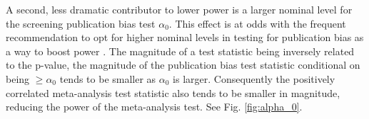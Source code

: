 \documentclass[12pt]{article}
\newcommand{\z}{Z}
\newcommand{\comment}[1]{
  \iftoggle{commenttoggle}{
    {\normalsize{\color{red}{ #1}}\normalsize}
  }
  {}
}
\begin{document}
A second, less dramatic contributor to lower power is a larger nominal level for
the screening publication bias test $\alpha_0$. \comment{For example, [[]]} This
effect is at odds with the frequent recommendation to opt for
higher nominal levels in testing for publication bias as a way to
boost power \citep{begg:94b,egger:97,macaskill:01}. The
magnitude of a test statistic being inversely related to the p-value, 
the magnitude of the publication bias test statistic conditional on being
$\ge \alpha_0$ tends to be smaller as $\alpha_0$ is
larger. Consequently the positively correlated meta-analysis test
statistic also tends to be smaller in magnitude, reducing the power
of the meta-analysis test. See Fig. \ref{fig:alpha_0}.
\end{document}

